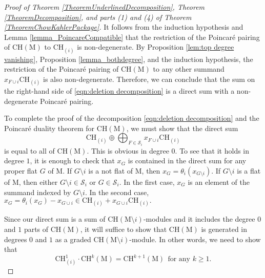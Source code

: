 \documentclass[11pt,reqno]{amsart}
\theoremstyle{definition}
\theoremstyle{remark}
\renewcommand{\(}{\left(}
\renewcommand{\)}{\right)}
\newcommand{\<}{\left<}
\renewcommand{\>}{\right>}
\begin{document}
\begin{proof}[Proof of Theorem \ref{TheoremUnderlinedDecomposition}, Theorem \ref{TheoremDecomposition}, and 
parts (1) and (4) of Theorem \ref{TheoremChowKahlerPackage}]
It follows from the induction hypothesis and Lemma \ref{lemma_PoincareCompatible} that the restriction of the Poincar\'e pairing of $\mathrm{CH}(\mathrm{M})$ to $\mathrm{CH}_{(i)}$ is non-degenerate. By Proposition \ref{lem:top degree vanishing}, Proposition \ref{lemma_bothdegree}, and the induction hypothesis, the restriction of the Poincar\'e pairing of $\mathrm{CH}(\mathrm{M})$ to any other summand $x_{F\cup i}\mathrm{CH}_{(i)}$ is also non-degenerate. Therefore, we can conclude that the sum on the right-hand side of \eqref{eqn:deletion decomposition} is a direct sum with a non-degenerate Poincar\'e pairing. 


To complete the proof of the decomposition \eqref{eqn:deletion decomposition} and the Poincar\'e duality theorem for $\mathrm{CH}(\mathrm{M})$, 
we must show that the direct sum
$$\mathrm{CH}_{(i)} \oplus \bigoplus_{F \in \mathscr{S}_i} x_{F\cup i} \mathrm{CH}_{(i)}$$
is equal to all of $\mathrm{CH}(\mathrm{M})$.
This is obvious in degree $0$.  To see that it holds in degree $1$, 
it is enough to check that  $x_G$ is contained in the direct sum for any proper flat $G$ of $\mathrm{M}$.
If $G \setminus i$ is a not flat of $\mathrm{M}$, then
$
x_G=\theta_i(x_{G \setminus i}).
$
If $G \setminus i$ is a flat of $\mathrm{M}$, then either $G \setminus i \in \mathscr{S}_i$
or $G \in \mathscr{S}_i$. In the first case, $x_G$ is an element of the summand indexed by $G \setminus i$.
In the second case,
$
x_G = \theta_i(x_G) - x_{G\cup i} \in \mathrm{CH}_{(i)} + x_{G\cup i}\mathrm{CH}_{(i)}.
$


Since our direct sum is a sum of $\mathrm{CH}(\mathrm{M}\setminus i)$-modules and it includes the degree $0$ and $1$ parts of $\mathrm{CH}(\mathrm{M})$, 
it will suffice to show that $\mathrm{CH}(\mathrm{M})$ is generated in degrees $0$ and $1$ as a graded $\mathrm{CH}(\mathrm{M}\setminus i)$-module. In other words, we need to show that
\[
\mathrm{CH}^1_{(i)}\cdot \mathrm{CH}^k(\mathrm{M})=\mathrm{CH}^{k+1}(\mathrm{M}) \ \ \text{for any $k \ge 1$.}
\]


\end{proof}
\end{document}
